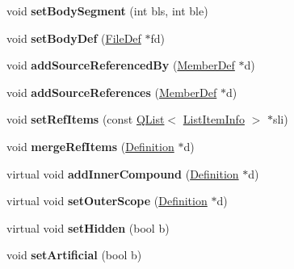 \begin{DoxyCompactItemize}
void {\bfseries set\+Body\+Segment} (int bls, int ble)
\item 
\mbox{\label{class_definition_a11177a4416320b6dd561b314d02c607a}} 
void {\bfseries set\+Body\+Def} (\mbox{\hyperlink{class_file_def}{File\+Def}} $\ast$fd)
\item 
\mbox{\label{class_definition_a06d25c9164855c20278be38829e2d72e}} 
void {\bfseries add\+Source\+Referenced\+By} (\mbox{\hyperlink{class_member_def}{Member\+Def}} $\ast$d)
\item 
\mbox{\label{class_definition_a153cd19977164802044d4602ee212aa3}} 
void {\bfseries add\+Source\+References} (\mbox{\hyperlink{class_member_def}{Member\+Def}} $\ast$d)
\item 
\mbox{\label{class_definition_afaacdadf442e3e1a33c22c5a2b49ad61}} 
void {\bfseries set\+Ref\+Items} (const \mbox{\hyperlink{class_q_list}{Q\+List}}$<$ \mbox{\hyperlink{struct_list_item_info}{List\+Item\+Info}} $>$ $\ast$sli)
\item 
\mbox{\label{class_definition_ac7a24516e805c39e3f3542c387601790}} 
void {\bfseries merge\+Ref\+Items} (\mbox{\hyperlink{class_definition}{Definition}} $\ast$d)
\item 
\mbox{\label{class_definition_a7acd14f8896e56cc2d6dcadd2cf14be7}} 
virtual void {\bfseries add\+Inner\+Compound} (\mbox{\hyperlink{class_definition}{Definition}} $\ast$d)
\item 
\mbox{\label{class_definition_a222010f3d2b52bf76427034d07e0ff56}} 
virtual void {\bfseries set\+Outer\+Scope} (\mbox{\hyperlink{class_definition}{Definition}} $\ast$d)
\item 
\mbox{\label{class_definition_a7166ab248989769fe2dc4f0d56b72a05}} 
virtual void {\bfseries set\+Hidden} (bool b)
\item 
\mbox{\label{class_definition_a3bef4741c9dfa6cd2287ca4c9f30f775}} 
void {\bfseries set\+Artificial} (bool b)
\item 
\mbox{\label{class_definition_abd33a001047f6842f63f551b1ce47942}} 

\end{DoxyCompactItemize}
